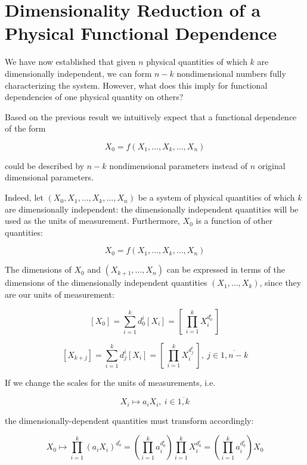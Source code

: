 \section{Dimensionality Reduction of a Physical Functional Dependence}

We have now established that given $n$ physical quantities of which $k$ are dimensionally independent, we can form $n - k$ nondimensional numbers fully characterizing the system. However, what does this imply for functional dependencies of one physical quantity on others? 

Based on the previous result we intuitively expect that a functional dependence of the form

$$X_0 = f(X_1, \hdots, X_k, \hdots, X_n)$$

could be described by $n - k$ nondimensional parameters instead of $n$ original dimensional parameters.

Indeed, let $(X_0, X_1, \hdots, X_k, \hdots, X_n)$ be a system of physical quantities of which $k$ are dimensionally independent: the dimensionally independent quantities will be used as the units of measurement. 
\newpage
Furthermore, $X_0$ is a function of other quantities:

\begin{equation} \label{1}
X_0 = f(X_1, \hdots, X_k, \hdots, X_n)
\end{equation}

The dimensions of $X_0$ and $(X_{k+1}, \hdots, X_n)$ can be expressed in terms of the dimensions of the dimensionally independent quantities $(X_1, \hdots, X_k)$, since they are our units of measurement:

$$ [X_0] = \sum \limits_{i=1}^{k} d_0^i [X_i] = [~\prod \limits_{i=1}^{k} X_i^{d_0^i}~] $$

$$ [X_{k+j}] = \sum \limits_{i=1}^{k} d_j^i [X_i] = [~\prod \limits_{i=1}^{k} X_i^{d_j^i}~],~ j \in \overline{1, n-k} $$

If we change the scales for the units of measurements, i.e.

\begin{equation} \label{scales}
X_i \mapsto a_i X_i,~ i \in \overline{1,k} 
\end{equation}

the dimensionally-dependent quantities must transform accordingly:

\begin{equation} \label{scales1}
 X_0 \mapsto \prod \limits_{i=1}^{k} (a_iX_i)^{d_0^i} = (\prod \limits_{i=1}^{k} a_i^{d_0^i}) \prod \limits_{i=1}^{k} X_i^{d_0^i} = (\prod \limits_{i=1}^{k} a_i^{d_0^i}) X_0 
\end{equation}

